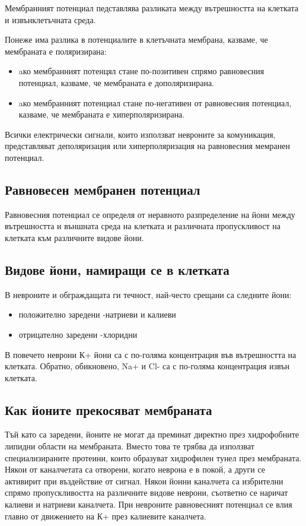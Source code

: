 \documentclass{article}
\begin{document}
Мембранният потенциал педставлява разликата между вътрешността на клетката и извънклетъчната среда.

Понеже има разлика в потенциалите в клетъчната мембрана, казваме, че мембраната е поляризирана:
\begin{itemize}
  \item aко мембранният потенцял стане по-позитивен спрямо равновесния потенциал, казваме, че мембраната е дополяризирана.
  \item aко мембранният потенциал стане по-негативен от равновесния потенциал, казваме, че мембраната е хиперполяризирана.
\end{itemize}

Всички електрически сигнали, които използват невроните за комуникация, представляват деполяризация или хиперполяризация на равновесния мемранен потенциал.

\subsection{Равновесен мембранен потенциал}

Равновесния потенциал се определя от неравното разпределение на йони между вътрешността и външната среда на клетката и различната пропускливост на клетката към различните видове йони.

\subsection{Видове йони, намиращи се в клетката}

В невроните и обграждащата ги течност, най-често срещани са следните йони:
\begin{itemize}
  \item положително заредени -натриеви и калиеви
  \item отрицателно заредени -хлоридни
\end{itemize}

В повечето неврони К+ йони са с по-голяма концентрация във вътрешността на клетката. Обратно, обикновено, Na+ и Cl- са с по-голяма концентрация извън клетката.

\subsection{Как йоните прекосяват мембраната}

Тъй като са заредени, йоните не могат да преминат директно през хидрофобните липидни области на мембраната. Вместо това те трябва да използват специализираните протеини, които образуват хидрофилен тунел през мембраната. Някои от каналчетата са отворени, когато неврона е в покой, а други се активирит при въздействие от сигнал. Някои йонни каналчета са избрителни спрямо пропускливостта на различните видове неврони, съответно се наричат калиеви и натриеви каналчета. При невроните равновесният потенциал се влия главно от движението на К+ през калиевите каналчета.
\end{document}
